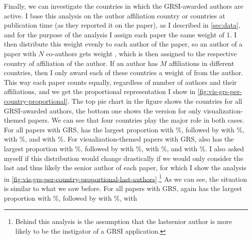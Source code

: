 \documentclass[conference]{vgtc}                     %
\begin{document}
Finally, we can investigate the countries in which the GRSI-awarded authors are active. I base this analysis on the author affiliation country or countries at publication time (as they reported it on the paper), as I described in \autoref{sec:data}, and for the purpose of the analysis I assign each paper the same weight of 1. I then distribute this weight evenly to each author of the paper, so an author of a paper with $N$ co-authors gets weight , which is then assigned to the respective country of affiliation of the author. If an author has $M$ affiliations in different countries, then I only award each of these countries a weight of  from the author. This way each paper counts equally, regardless of number of authors and their affiliations, and we get the proportional representation I show in \autoref{fig:vis-grs-per-country-proportional}. The top pie chart in the figure shows the countries for all GRSI-awarded authors, the bottom one shows the version for only visualization-themed papers. We can see that four countries play the major role in both cases. For all papers with GRS, \GrsiCountryPieChartOverallNoOneName{}{} has the largest proportion with \GrsiCountryPieChartOverallNoOnePercentage{}\%, followed by \GrsiCountryPieChartOverallNoTwoName{} with \GrsiCountryPieChartOverallNoTwoPercentage{}\%, \GrsiCountryPieChartOverallNoThreeName{} with \GrsiCountryPieChartOverallNoThreePercentage{}\%, and \GrsiCountryPieChartOverallNoFourName{} with \GrsiCountryPieChartOverallNoFourPercentage{}\%. For visualization-themed papers with GRS, \GrsiCountryPieChartVisNoOneName{} also has the largest proportion with \GrsiCountryPieChartVisNoOnePercentage{}\%, followed by \GrsiCountryPieChartVisNoTwoName{} with \GrsiCountryPieChartVisNoTwoPercentage{}\%, \GrsiCountryPieChartVisNoThreeName{} with \GrsiCountryPieChartVisNoThreePercentage{}\%, and \GrsiCountryPieChartVisNoFourName{} with \GrsiCountryPieChartVisNoFourPercentage{}\%. I also asked myself if this distribution would change drastically if we would only consider the last and thus likely the senior author of each paper, for which I show the analysis in \autoref{fig:vis-grs-per-country-proportional-last-authors}.\footnote{Behind this analysis is the assumption that the last\discretionary{/}{}{/}senior author is more likely to be the instigator of a GRSI application.} As we can see, the situation is similar to what we saw before. For all papers with GRS, \GrsiCountryPieChartOverallSeniorNoOneName{}{} again has the largest proportion with \GrsiCountryPieChartOverallSeniorNoOnePercentage{}\%, followed by \GrsiCountryPieChartOverallSeniorNoTwoName{} with \GrsiCountryPieChartOverallSeniorNoTwoPercentage{}\%, \GrsiCountryPieChartOverallSeniorNoThreeName{} with 
\end{document}

